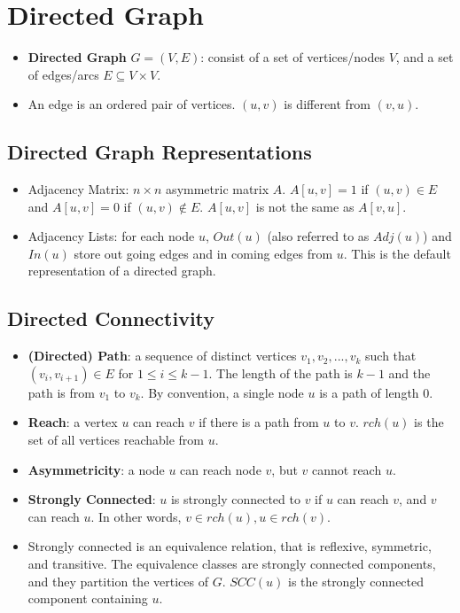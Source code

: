 \documentclass[12pt]{article}
\date{March 23, 2021}
\begin{document}
\maketitle

\section{Directed Graph}
\begin{itemize}
    \item \textbf{Directed Graph} $G = (V, E)$: consist of a set of vertices/nodes $V$, and a set of edges/arcs $E \subseteq V \times V$.
    \item An edge is an ordered pair of vertices. $(u, v)$ is different from $(v, u)$.
\end{itemize}

\subsection{Directed Graph Representations}
\begin{itemize}
    \item Adjacency Matrix: $n \times n$ asymmetric matrix $A$. $A[u, v] = 1$ if $(u, v) \in E$ and $A[u, v] = 0$ if $(u, v) \notin E$. $A[u, v]$ is not the same as $A[v, u]$.
    \item Adjacency Lists: for each node $u$, $Out(u)$ (also referred to as $Adj(u)$) and $In(u)$ store out going edges and in coming edges from $u$. This is the default representation of a directed graph.
\end{itemize}

\subsection{Directed Connectivity}
\begin{itemize}
    \item \textbf{(Directed) Path}: a sequence of distinct vertices $v_1, v_2, ..., v_k$ such that $(v_i, v_{i + 1}) \in E$ for $1 \leq i \leq k - 1$. The length of the path is $k - 1$ and the path is from $v_1$ to $v_k$. By convention, a single node $u$ is a path of length $0$.
    \item \textbf{Reach}: a vertex $u$ can reach $v$ if there is a path from $u$ to $v$. $rch(u)$ is the set of all vertices reachable from $u$.
    \item \textbf{Asymmetricity}: a node $u$ can reach node $v$, but $v$ cannot reach $u$.
    \item \textbf{Strongly Connected}: $u$ is strongly connected to $v$ if $u$ can reach $v$, and $v$ can reach $u$. In other words, $v \in rch(u), u \in rch(v)$.
    \item Strongly connected is an equivalence relation, that is reflexive, symmetric, and transitive. The equivalence classes are strongly connected components, and they partition the vertices of $G$. $SCC(u)$ is the strongly connected component containing $u$.
\end{itemize}
\end{document}
